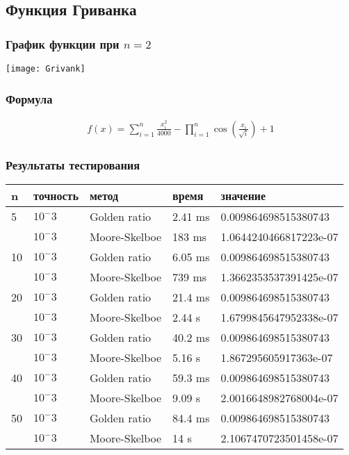 \documentclass{article}
\begin{document}
    \subsection{Функция Гриванка}

    \subsubsection{График функции при $n=2$}
    \texttt{[image: Grivank]}

    \subsubsection{Формула}
    \begin{gather*}
        f(x)=\sum_{i=1}^n \frac{x_i^2}{4000}-\prod_{i=1}^n \cos \left(\frac{x_i}{\sqrt{i}}\right)+1
    \end{gather*}

    \subsubsection{Результаты тестирования}

    \begin{tabular}{ |p{2cm}|p{2cm}|p{3cm}|p{2cm}|p{4cm}|  }
        \hline
        n  & точность & метод         & время   & значение               \\
        \hline
        5  & $10^-3$  & Golden ratio  & 2.41 ms & 0.009864698515380743   \\\cline{2-5}
        & $10^-3$  & Moore-Skelboe & 183 ms  & 1.0644240466817223e-07 \\
        \hline
        10 & $10^-3$  & Golden ratio  & 6.05 ms & 0.009864698515380743   \\\cline{2-5}
        & $10^-3$  & Moore-Skelboe & 739 ms  & 1.3662353537391425e-07 \\
        \hline
        20 & $10^-3$  & Golden ratio  & 21.4 ms & 0.009864698515380743   \\\cline{2-5}
        & $10^-3$  & Moore-Skelboe & 2.44 s  & 1.6799845647952338e-07 \\
        \hline
        30 & $10^-3$  & Golden ratio  & 40.2 ms & 0.009864698515380743   \\\cline{2-5}
        & $10^-3$  & Moore-Skelboe & 5.16 s  & 1.867295605917363e-07  \\
        \hline
        40 & $10^-3$  & Golden ratio  & 59.3 ms & 0.009864698515380743   \\\cline{2-5}
        & $10^-3$  & Moore-Skelboe & 9.09 s  & 2.0016648982768004e-07 \\
        \hline
        50 & $10^-3$  & Golden ratio  & 84.4 ms & 0.009864698515380743   \\\cline{2-5}
        & $10^-3$  & Moore-Skelboe & 14 s    & 2.1067470723501458e-07 \\
        \hline

    \end{tabular}
\end{document}
